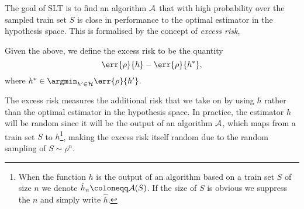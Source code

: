 The goal of SLT is to find an algorithm \(\mathcal{A}\) that with high probability
over the sampled train set \(S\) is close in performance to the optimal
estimator in the hypothesis space. This is formalised by the concept of
\emph{excess risk},
\begin{definition}
  \label{def:excess-risk} Given the above, we define the excess risk to be the
quantity
  \begin{equation}
    \label{eq:excess-risk} \err{\rho}{h} - \err{\rho}{h^{\ast}},
  \end{equation} where \(h^{\ast} \in \argmin_{h' \in \rkhs{H}}\err{\rho}{h'}\).
\end{definition} The excess risk measures the additional risk that we take on by
using \(h\) rather than the optimal estimator in the hypothesis space. In
practice, the estimator \(h\) will be random since it will be the output of an
algorithm \(\mathcal{A}\), which maps from a train set \(S\) to \(h\)\footnote{When
the function \(h\) is the output of an algorithm based on a train set \(S\) of
size \(n\) we denote \(\hat{h}_{n} \coloneqq \algo(S)\). If the size of \(S\) is
obvious we suppress the \(n\) and simply write \(\hat{h}\).}, making the excess
risk itself random due to the random sampling of \(S \sim \rho^{n}\).

